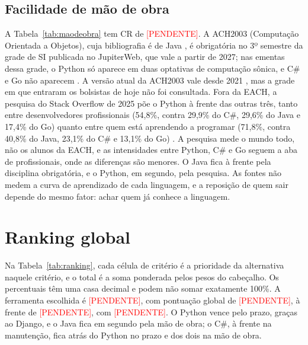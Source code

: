 \documentclass[a4paper]{article}
\newcommand{\pendente}{\textcolor{red}{[PENDENTE]}}
\newcommand{\crMaoDeObra}{\pendente}
\newcommand{\primeiroLugar}{\pendente}
\newcommand{\pontuacaoPrimeiro}{\pendente}
\newcommand{\segundoLugar}{\pendente}
\newcommand{\pontuacaoSegundo}{\pendente}
\newcommand{\tabelagerada}[1]{\IfFileExists{tabelas/#1.tex}{}{\textcolor{red}{[PENDENTE: rodar ahp.py]}}}
\begin{document}
\subsection{Facilidade de mão de obra}

\begin{table}[H]
    \centering
    \small
    \renewcommand{\arraystretch}{1.25}
    \tabelagerada{matriz_maodeobra}
    \caption{Matriz de comparação e vetor de prioridades sob o critério facilidade de mão de obra (CR~=~\crMaoDeObra).}
    \label{tab:maodeobra}
\end{table}

A Tabela~\ref{tab:maodeobra} tem CR de \crMaoDeObra. A ACH2003 (Computação Orientada a Objetos), cuja bibliografia é de Java \cite{ach2003}, é obrigatória no 3º semestre da grade de SI publicada no JupiterWeb, que vale a partir de 2027; nas ementas dessa grade, o Python só aparece em duas optativas de computação sônica, e C\# e Go não aparecem \cite{gradesi}. A versão atual da ACH2003 vale desde 2021 \cite{ach2003}, mas a grade em que entraram os bolsistas de hoje não foi consultada. Fora da EACH, a pesquisa do Stack Overflow de 2025 põe o Python à frente das outras três, tanto entre desenvolvedores profissionais (54,8\%, contra 29,9\% do C\#, 29,6\% do Java e 17,4\% do Go) quanto entre quem está aprendendo a programar (71,8\%, contra 40,8\% do Java, 23,1\% do C\# e 13,1\% do Go) \cite{so2025}. A pesquisa mede o mundo todo, não os alunos da EACH, e as intensidades entre Python, C\# e Go seguem a aba de profissionais, onde as diferenças são menores. O Java fica à frente pela disciplina obrigatória, e o Python, em segundo, pela pesquisa. As fontes não medem a curva de aprendizado de cada linguagem, e a reposição de quem sair depende do mesmo fator: achar quem já conhece a linguagem.

\section{Ranking global}

Na Tabela~\ref{tab:ranking}, cada célula de critério é a prioridade da alternativa naquele critério, e o total é a soma ponderada pelos pesos do cabeçalho. Os percentuais têm uma casa decimal e podem não somar exatamente 100\%. A ferramenta escolhida é \primeiroLugar, com pontuação global de \pontuacaoPrimeiro, à frente de \segundoLugar, com \pontuacaoSegundo. O Python vence pelo prazo, graças ao Django, e o Java fica em segundo pela mão de obra; o C\#, à frente na manutenção, fica atrás do Python no prazo e dos dois na mão de obra.
\end{document}
